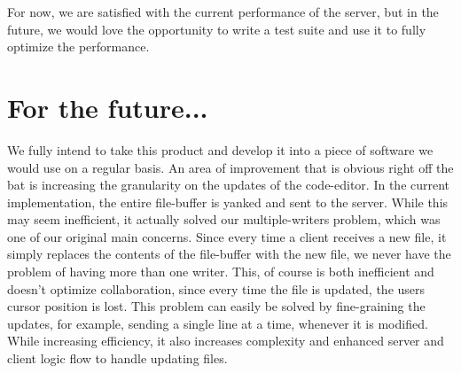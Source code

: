 \documentclass[12pt, letterpaper]{article}
\begin{document}
For now, we are satisfied with the current performance of the server, 
but in the future, we would love the opportunity to write a test suite 
and use it to fully optimize the performance.

\section*{For the future...}

We fully intend to take this product and develop it into a piece of 
software we would use on a regular basis. An area of improvement that 
is obvious right off the bat is increasing the granularity on the 
updates of the code-editor. In the current implementation, the entire 
file-buffer is yanked and sent to the server. While this may seem 
inefficient, it actually solved our multiple-writers problem, which was 
one of our original main concerns. Since every time a client receives a 
new file, it simply replaces the contents of the file-buffer with the 
new file, we never have the problem of having more than one writer. 
This, of course is both inefficient and doesn't optimize collaboration, 
since every time the file is updated, the users cursor position is lost. 
This problem can easily be solved by fine-graining the updates, for 
example, sending a single line at a time, whenever it is modified. 
While increasing efficiency, it also increases complexity and enhanced 
server and client logic flow to handle updating files.
\end{document}
